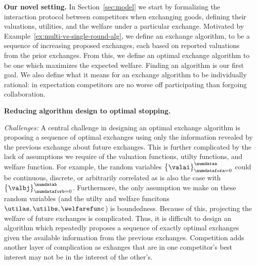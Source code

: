\textbf{Our novel setting.} 
In Section~\ref{sec:model} we start by formalizing the interaction protocol
between competitors when exchanging goods, defining their valuations, utilities, and the welfare under
a particular exchange. 
Motivated by Example~\ref{ex:multi-vs-single-round-alg}, we define an exchange algorithm, to be a sequence
of increasing proposed exchanges, each based on reported valuations from the prior exchanges.
From this, we define an optimal exchange algorithm to be one which maximizes the
expected welfare. 
Finding an algorithm is our first goal.
We also define what it means for an exchange algorithm to be individually rational: in expectation 
competitors are no worse off participating than forgoing collaboration.

\textbf{Reducing algorithm design to optimal stopping.} 

\emph{Challenges:}
A central challenge in designing an optimal exchange algorithm is proposing a sequence 
of optimal exchanges using only the information revealed by the previous exchange about 
future exchanges.
This is further complicated by the lack of assumptions we require of 
the valuation functions,
utilty functions, and welfare function. For example, 
the random variables 
\(
    \big\{
        \valai
    \big\}_{\numdatafora=0}^\numdataa
\)
could be continuous, discrete, or arbitrarily correlated
as is also the case with
\(
    \big\{
        \valbj
    \big\}_{\numdataforb=0}^\numdatab
\).
Furthermore, the only assumption we make on these random variables (and the utilty and welfare funcitons 
$\utilas,\utilbs,\welfarefunc$) is boundedness.
Because of this, projecting the welfare of future exchanges is complicated.
Thus, it is difficult to design an algorithm which repeatedly proposes
a sequence of exactly optimal exchanges given the available information from the previous exchanges.
Competition adds another layer of complication as exhanges that are in one competitor's best interest may not 
be in the interest of the other's.

